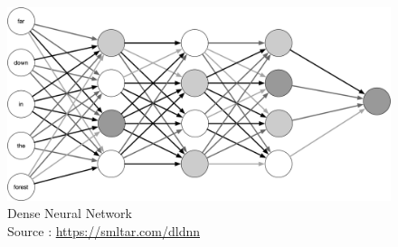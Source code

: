     \begin{figure}[h]
        \centering
        \includegraphics[width=1\linewidth]{img/Graphics/dense-nn.png}
        \caption{Dense Neural Network\\Source : \url{https://smltar.com/dldnn}}
        \label{dense-nn}
    \end{figure}
    \newpage
 \newpage

